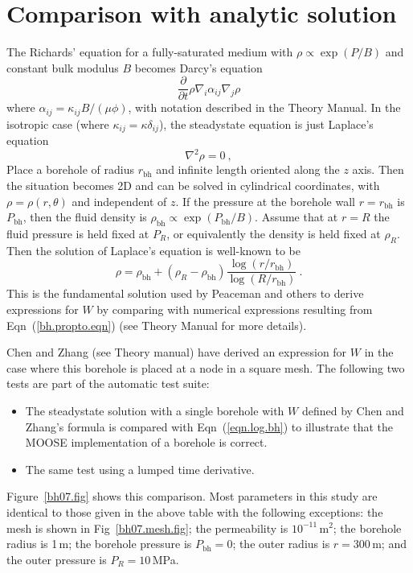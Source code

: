 \documentclass[]{scrreprt}
\begin{document}
\section{Comparison with analytic solution}
The Richards' equation for a fully-saturated medium with $\rho \propto
\exp(P/B)$ and constant bulk modulus $B$ becomes Darcy's equation
\begin{equation}
\frac{\partial}{\partial t}\rho \nabla_{i}\alpha_{ij}\nabla_{j}\rho
\end{equation}
where $\alpha_{ij} = \kappa_{ij}B/(\mu\phi)$, with notation described
in the Theory Manual.   In the isotropic case (where $\kappa_{ij} =
\kappa \delta_{ij}$), the steadystate equation is just Laplace's
equation
\begin{equation}
\nabla^{2}\rho = 0 \ ,
\end{equation}
Place a borehole of radius $r_{\mathrm{bh}}$ and infinite length
oriented along the $z$ axis.  Then the situation becomes 2D and can be
solved in cylindrical coordinates, with $\rho=\rho(r,\theta)$ and
independent of $z$.  If the pressure at the borehole wall
$r=r_{\mathrm{bh}}$ is $P_{\mathrm{bh}}$, then the fluid density is
$\rho_{\mathrm{bh}} \propto \exp(P_{\mathrm{bh}}/B)$.  Assume that at
$r=R$ the fluid pressure is held fixed at $P_{R}$, or equivalently the
density is held fixed at $\rho_{R}$.  Then the solution of Laplace's
equation is well-known to be
\begin{equation}
\rho = \rho_{\mathrm{bh}} + (\rho_{R} - \rho_{\mathrm{bh}})
\frac{\log(r/r_{\mathrm{bh}})}{\log(R/r_{\mathrm{bh}})} \ .
\label{eqn.log.bh}
\end{equation}
This is the fundamental solution used by Peaceman and others to derive
expressions for $W$ by comparing with numerical expressions resulting
from Eqn~(\ref{bh.propto.eqn}) (see Theory Manual for more details).

Chen and Zhang (see Theory manual) have derived an expression for $W$
in the case where this borehole is placed at a node in a square mesh.
The following two tests are part of the automatic test suite:
\begin{itemize}
\item The steadystate solution with a single borehole with $W$ defined by
Chen and Zhang's formula is compared with Eqn~(\ref{eqn.log.bh}) to
illustrate that the MOOSE implementation of a borehole is correct.
\item The same test using a lumped time derivative.
\end{itemize}
Figure~\ref{bh07.fig} shows this comparison.  Most parameters in this
study are identical to those given in the above table with the
following exceptions: the mesh is shown in Fig~\ref{bh07.mesh.fig};
the permeability is $10^{-11}$\,m$^{2}$; the borehole radius is 1\,m;
the borehole pressure is $P_{\mathrm{bh}}=0$; the outer radius is
$r=300$\,m; and the outer pressure is $P_{R}=10$\,MPa.
\end{document}

